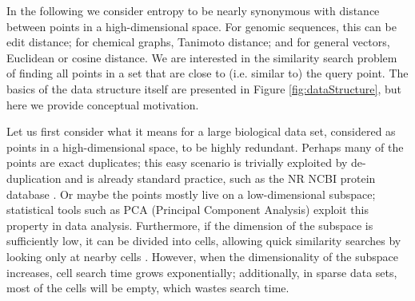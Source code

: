 \documentclass[review,preprint,12pt]{elsarticle}
\renewcommand{\cite}{\citep} %
\theoremstyle{definition}
\theoremstyle{remark}
\numberwithin{equation}{section}
\begin{document}
In the following we consider entropy to be nearly synonymous with distance between points in a high-dimensional space.
For genomic sequences, this can be edit distance; for chemical graphs, Tanimoto 
distance; and for general vectors, Euclidean or cosine distance.
We are interested in the similarity search problem of
finding all points in a set that are close to (i.e. similar to) the query point.
The basics of the data structure itself are presented in Figure \ref{fig:dataStructure}, but here we provide conceptual motivation.

Let us first consider what it means for a large biological data set, considered as points in a high-dimensional space, to be highly redundant.
Perhaps many of the points are exact duplicates; this easy scenario is trivially exploited by de-duplication and is already standard practice, such as
the NR NCBI protein database \cite{pruitt2005ncbi}.
Or maybe the points mostly live on a low-dimensional subspace; statistical tools such as PCA (Principal Component Analysis) exploit this property in data analysis.
Furthermore, if the dimension of the subspace is sufficiently low,
it can be divided into cells, allowing quick similarity searches by looking only at nearby cells \cite{weber1998quantitative}.
However, when the dimensionality of the subspace increases, cell search time 
grows exponentially; additionally, in sparse data sets, most of the cells will 
be empty, which wastes search time.
\end{document}
